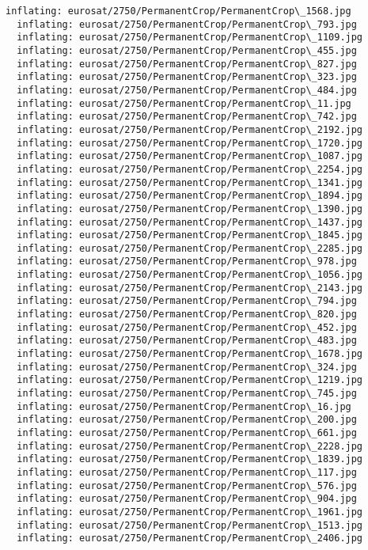 \documentclass[11pt]{article}
\begin{document}
\begin{Verbatim}[commandchars=\\\{\}]
  inflating: eurosat/2750/PermanentCrop/PermanentCrop\_1568.jpg
  inflating: eurosat/2750/PermanentCrop/PermanentCrop\_793.jpg
  inflating: eurosat/2750/PermanentCrop/PermanentCrop\_1109.jpg
  inflating: eurosat/2750/PermanentCrop/PermanentCrop\_455.jpg
  inflating: eurosat/2750/PermanentCrop/PermanentCrop\_827.jpg
  inflating: eurosat/2750/PermanentCrop/PermanentCrop\_323.jpg
  inflating: eurosat/2750/PermanentCrop/PermanentCrop\_484.jpg
  inflating: eurosat/2750/PermanentCrop/PermanentCrop\_11.jpg
  inflating: eurosat/2750/PermanentCrop/PermanentCrop\_742.jpg
  inflating: eurosat/2750/PermanentCrop/PermanentCrop\_2192.jpg
  inflating: eurosat/2750/PermanentCrop/PermanentCrop\_1720.jpg
  inflating: eurosat/2750/PermanentCrop/PermanentCrop\_1087.jpg
  inflating: eurosat/2750/PermanentCrop/PermanentCrop\_2254.jpg
  inflating: eurosat/2750/PermanentCrop/PermanentCrop\_1341.jpg
  inflating: eurosat/2750/PermanentCrop/PermanentCrop\_1894.jpg
  inflating: eurosat/2750/PermanentCrop/PermanentCrop\_1390.jpg
  inflating: eurosat/2750/PermanentCrop/PermanentCrop\_1437.jpg
  inflating: eurosat/2750/PermanentCrop/PermanentCrop\_1845.jpg
  inflating: eurosat/2750/PermanentCrop/PermanentCrop\_2285.jpg
  inflating: eurosat/2750/PermanentCrop/PermanentCrop\_978.jpg
  inflating: eurosat/2750/PermanentCrop/PermanentCrop\_1056.jpg
  inflating: eurosat/2750/PermanentCrop/PermanentCrop\_2143.jpg
  inflating: eurosat/2750/PermanentCrop/PermanentCrop\_794.jpg
  inflating: eurosat/2750/PermanentCrop/PermanentCrop\_820.jpg
  inflating: eurosat/2750/PermanentCrop/PermanentCrop\_452.jpg
  inflating: eurosat/2750/PermanentCrop/PermanentCrop\_483.jpg
  inflating: eurosat/2750/PermanentCrop/PermanentCrop\_1678.jpg
  inflating: eurosat/2750/PermanentCrop/PermanentCrop\_324.jpg
  inflating: eurosat/2750/PermanentCrop/PermanentCrop\_1219.jpg
  inflating: eurosat/2750/PermanentCrop/PermanentCrop\_745.jpg
  inflating: eurosat/2750/PermanentCrop/PermanentCrop\_16.jpg
  inflating: eurosat/2750/PermanentCrop/PermanentCrop\_200.jpg
  inflating: eurosat/2750/PermanentCrop/PermanentCrop\_661.jpg
  inflating: eurosat/2750/PermanentCrop/PermanentCrop\_2228.jpg
  inflating: eurosat/2750/PermanentCrop/PermanentCrop\_1839.jpg
  inflating: eurosat/2750/PermanentCrop/PermanentCrop\_117.jpg
  inflating: eurosat/2750/PermanentCrop/PermanentCrop\_576.jpg
  inflating: eurosat/2750/PermanentCrop/PermanentCrop\_904.jpg
  inflating: eurosat/2750/PermanentCrop/PermanentCrop\_1961.jpg
  inflating: eurosat/2750/PermanentCrop/PermanentCrop\_1513.jpg
  inflating: eurosat/2750/PermanentCrop/PermanentCrop\_2406.jpg

\end{Verbatim}
\end{document}
